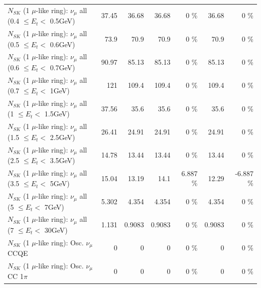 \begin{table}
\begin{tabular}{| l | r | r | r  r | r  r |}
       $N_{SK}$ (1 $\mu$-like ring): $\nu_{\mu}$ all (0.4 $\leq E_{t} <$ 0.5GeV) &           37.45 &           36.68 &           36.68 &        0 \%  &           36.68 &        0 \%  \\ 
       $N_{SK}$ (1 $\mu$-like ring): $\nu_{\mu}$ all (0.5 $\leq E_{t} <$ 0.6GeV) &            73.9 &            70.9 &            70.9 &        0 \%  &            70.9 &        0 \%  \\ 
       $N_{SK}$ (1 $\mu$-like ring): $\nu_{\mu}$ all (0.6 $\leq E_{t} <$ 0.7GeV) &           90.97 &           85.13 &           85.13 &        0 \%  &           85.13 &        0 \%  \\ 
         $N_{SK}$ (1 $\mu$-like ring): $\nu_{\mu}$ all (0.7 $\leq E_{t} <$ 1GeV) &             121 &           109.4 &           109.4 &        0 \%  &           109.4 &        0 \%  \\ 
         $N_{SK}$ (1 $\mu$-like ring): $\nu_{\mu}$ all (1 $\leq E_{t} <$ 1.5GeV) &           37.56 &            35.6 &            35.6 &        0 \%  &            35.6 &        0 \%  \\ 
       $N_{SK}$ (1 $\mu$-like ring): $\nu_{\mu}$ all (1.5 $\leq E_{t} <$ 2.5GeV) &           26.41 &           24.91 &           24.91 &        0 \%  &           24.91 &        0 \%  \\ 
       $N_{SK}$ (1 $\mu$-like ring): $\nu_{\mu}$ all (2.5 $\leq E_{t} <$ 3.5GeV) &           14.78 &           13.44 &           13.44 &        0 \%  &           13.44 &        0 \%  \\ 
         $N_{SK}$ (1 $\mu$-like ring): $\nu_{\mu}$ all (3.5 $\leq E_{t} <$ 5GeV) &           15.04 &           13.19 &            14.1 &    6.887 \%  &           12.29 &   -6.887 \%  \\ 
           $N_{SK}$ (1 $\mu$-like ring): $\nu_{\mu}$ all (5 $\leq E_{t} <$ 7GeV) &           5.302 &           4.354 &           4.354 &        0 \%  &           4.354 &        0 \%  \\ 
          $N_{SK}$ (1 $\mu$-like ring): $\nu_{\mu}$ all (7 $\leq E_{t} <$ 30GeV) &           1.131 &          0.9083 &          0.9083 &        0 \%  &          0.9083 &        0 \%  \\ 
\hline
\hline
                               $N_{SK}$ (1 $\mu$-like ring): Osc. $\nu_\mu$ CCQE &               0 &               0 &               0 &        0 \%  &               0 &        0 \%  \\ 
                          $N_{SK}$ (1 $\mu$-like ring): Osc. $\nu_\mu$ CC 1$\pi$ &               0 &               0 &               0 &        0 \%  &               0 &        0 \%  \\ 

\end{tabular}
\end{table}
